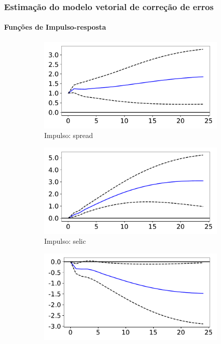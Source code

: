 \documentclass{beamer}
\begin{document}
\begin{frame}
    \frametitle{Estimação do modelo vetorial de correção de erros}
    \framesubtitle{Funções de Impulso-resposta}
    \begin{figure}[!hbt]
        \begin{subfigure}[t]{.4\linewidth}
            \includegraphics[width = \textwidth, scale=1]{irf/spread_spread.pdf}
            \caption{Impulso: spread}
        \end{subfigure}
        \begin{subfigure}[t]{.4\linewidth}
            \includegraphics[width = \textwidth, scale=1]{irf/spread_selic.pdf}
            \caption{Impulso: selic}
        \end{subfigure}
        \begin{subfigure}[t]{.4\linewidth}
            \includegraphics[width = \textwidth, scale=1]{irf/spread_inad.pdf}

\end{subfigure}
\end{figure}
\end{frame}
\end{document}
